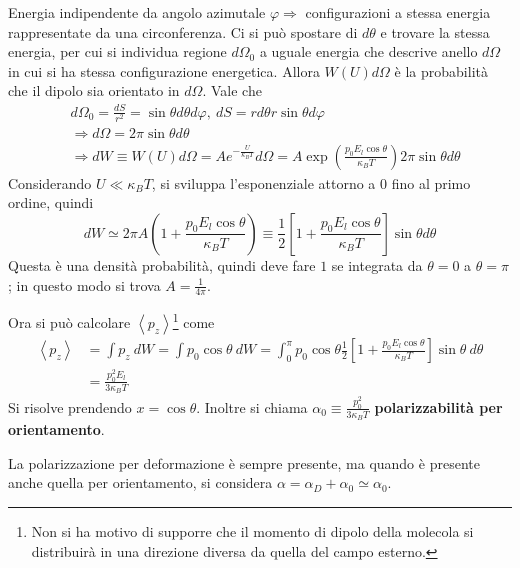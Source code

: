 \documentclass[a4paper]{scrartcl}
\numberwithin{equation}{subsection}
\theoremstyle{style1}
\begin{document}
Energia indipendente da angolo azimutale $\varphi \Rightarrow $ configurazioni a stessa energia rappresentate da una circonferenza. Ci si pu\`o spostare di $d\theta $ e trovare la stessa energia, per cui si individua regione $d\Omega_0$ a uguale energia che descrive anello $d\Omega $ in cui si ha stessa configurazione energetica. Allora $W(U) d\Omega $ \`e la probabilit\`a che il dipolo sia orientato in $d\Omega$. Vale che
\begin{equation}
	\begin{split}
		&d\Omega_0 = \frac{dS}{r^2}=\sin \theta  d\theta  d\varphi, \ dS = r d\theta  r \sin \theta  d\varphi \\
		&\Rightarrow d\Omega = 2 \pi \sin \theta  d\theta \\
		&\Rightarrow dW \equiv W(U) d\Omega = Ae^{- \frac{U}{\kappa _B T}}  d\Omega =A\exp \left(\frac{p_0 E_l \cos \theta }{\kappa _B T}\right) 2\pi\sin \theta  d\theta  
	\end{split}
\end{equation}
Considerando $U \ll \kappa _B T$, si sviluppa l'esponenziale attorno a $0$ fino al primo ordine, quindi
\begin{equation}
	dW \simeq 2\pi A \left(1+ \frac{p_0 E_l \cos \theta }{\kappa _B T}\right) \equiv \frac{1}{2}\left[ 1+ \frac{p_0 E_l \cos \theta }{\kappa _B T} \right] \sin \theta  d\theta 
\end{equation}
Questa \`e una densit\`a probabilit\`a, quindi deve fare $1$ se integrata da $\theta =0$ a $\theta =\pi$; in questo modo si trova $A = \frac{1}{4 \pi}$.

Ora si pu\`o calcolare $\left\langle p_z \right\rangle$\footnote{Non si ha motivo di supporre che il momento di dipolo della molecola si distribuir\`a in una direzione diversa da quella del campo esterno.} come
\begin{equation}
	\begin{split}
		\left\langle p_z \right\rangle &= \int p_z\ dW = \int p_0\cos \theta\  dW = \int_{0} ^\pi p_0 \cos \theta  \frac{1}{2}\left[ 1+ \frac{p_0 E_l \cos \theta }{\kappa _B T} \right] \sin \theta  \ d \theta \\
					       &= \frac{p_0^2 E_l }{3\kappa _B T}
	\end{split}
\end{equation}
Si risolve prendendo $x=\cos \theta $. Inoltre si chiama $\alpha _0 \equiv \frac{p_0^2}{3\kappa _B T}$ \textbf{polarizzabilit\`a per orientamento}. 

La polarizzazione per deformazione \`e sempre presente, ma quando \`e presente anche quella per orientamento, si considera $\alpha  = \alpha _D + \alpha_0 \simeq \alpha _0$.
\end{document}
